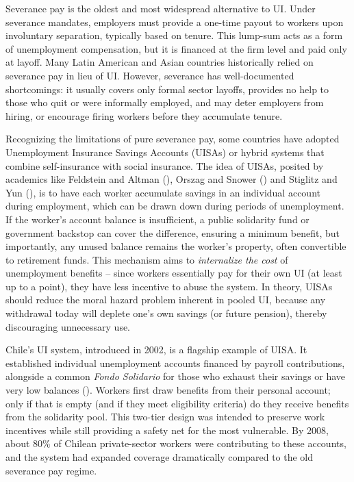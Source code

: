 \documentclass[
  4pt,
]{report}
\begin{document}
Severance pay is the oldest and most widespread alternative to UI. Under
severance mandates, employers must provide a one-time payout to workers
upon involuntary separation, typically based on tenure. This lump-sum
acts as a form of unemployment compensation, but it is financed at the
firm level and paid only at layoff. Many Latin American and Asian
countries historically relied on severance pay in lieu of UI. However,
severance has well-documented shortcomings: it usually covers only
formal sector layoffs, provides no help to those who quit or were
informally employed, and may deter employers from hiring, or encourage
firing workers before they accumulate tenure.

Recognizing the limitations of pure severance pay, some countries have
adopted Unemployment Insurance Savings Accounts (UISAs) or hybrid
systems that combine self-insurance with social insurance. The idea of
UISAs, posited by academics like Feldstein and Altman
(), Orszag and Snower
() and Stiglitz and Yun
(), is to have each worker accumulate
savings in an individual account during employment, which can be drawn
down during periods of unemployment. If the worker's account balance is
insufficient, a public solidarity fund or government backstop can cover
the difference, ensuring a minimum benefit, but importantly, any unused
balance remains the worker's property, often convertible to retirement
funds. This mechanism aims to \emph{internalize the cost} of
unemployment benefits -- since workers essentially pay for their own UI
(at least up to a point), they have less incentive to abuse the system.
In theory, UISAs should reduce the moral hazard problem inherent in
pooled UI, because any withdrawal today will deplete one's own savings
(or future pension), thereby discouraging unnecessary use.

Chile's UI system, introduced in 2002, is a flagship example of UISA. It
established individual unemployment accounts financed by payroll
contributions, alongside a common \emph{Fondo Solidario} for those who
exhaust their savings or have very low balances
(). Workers
first draw benefits from their personal account; only if that is empty
(and if they meet eligibility criteria) do they receive benefits from
the solidarity pool. This two-tier design was intended to preserve work
incentives while still providing a safety net for the most vulnerable.
By 2008, about 80\% of Chilean private-sector workers were contributing
to these accounts, and the system had expanded coverage dramatically
compared to the old severance pay regime.
\end{document}

